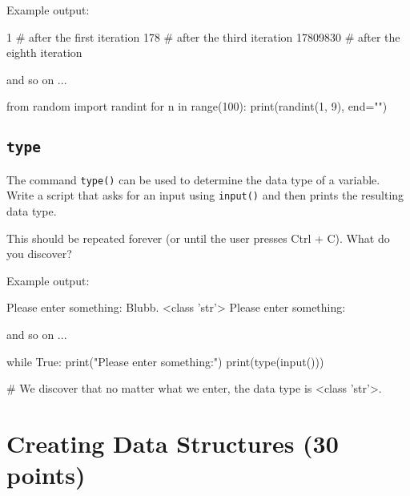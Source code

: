 \vspace{1em}

\noindent Example output:

\begin{outputcode}
1        # after the first  iteration
178      # after the third  iteration
17809830 # after the eighth iteration

and so on ...
\end{outputcode}

\begin{solution}
	\begin{pythoncode}
from random import randint
for n in range(100):
	print(randint(1, 9), end="")
	\end{pythoncode}
\end{solution}

\subsection{\texttt{type}}

The command \texttt{type()} can be used to determine the data type of a variable. Write a script that asks for an input using \texttt{input()} and then prints the resulting data type. 

\vspace{1em}

\noindent This should be repeated forever (or until the user presses Ctrl + C). What do you discover?

\vspace{1em}

\noindent Example output:

\begin{outputcode}
Please enter something:
Blubb.
<class 'str'>
Please enter something:

and so on ...
\end{outputcode}

\begin{solution}
	\begin{pythoncode}
while True:
	print("Please enter something:")
	print(type(input()))

# We discover that no matter what we enter, the data type is <class 'str'>.
	\end{pythoncode}
\end{solution}


\section{Creating Data Structures (30 points)}

